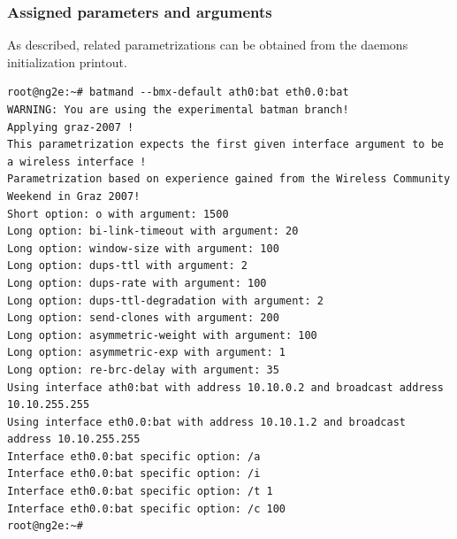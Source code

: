 \documentclass[11pt]{article}
\begin{document}
\subsubsection{Assigned parameters and arguments}
\label{sec:graz-2007-parameters}

As described, related parametrizations can be obtained from the daemons initialization printout. 


\begin{small} \begin{verbatim}
root@ng2e:~# batmand --bmx-default ath0:bat eth0.0:bat
WARNING: You are using the experimental batman branch!
Applying graz-2007 !
This parametrization expects the first given interface argument to be a wireless interface !
Parametrization based on experience gained from the Wireless Community Weekend in Graz 2007!
Short option: o with argument: 1500
Long option: bi-link-timeout with argument: 20
Long option: window-size with argument: 100
Long option: dups-ttl with argument: 2
Long option: dups-rate with argument: 100
Long option: dups-ttl-degradation with argument: 2
Long option: send-clones with argument: 200
Long option: asymmetric-weight with argument: 100
Long option: asymmetric-exp with argument: 1
Long option: re-brc-delay with argument: 35
Using interface ath0:bat with address 10.10.0.2 and broadcast address 10.10.255.255
Using interface eth0.0:bat with address 10.10.1.2 and broadcast address 10.10.255.255
Interface eth0.0:bat specific option: /a
Interface eth0.0:bat specific option: /i
Interface eth0.0:bat specific option: /t 1
Interface eth0.0:bat specific option: /c 100
root@ng2e:~#
\end{verbatim} \end{small}
\end{document}
